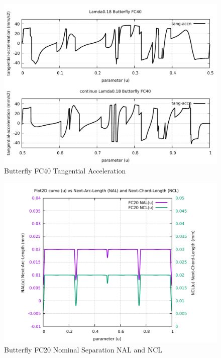\begin{figure}
	\caption     {Butterfly FC40 Tangential Acceleration}
	\label{24-img-Butterfly-FC40-Tangential-Acceleration.pdf}
	\includegraphics[width=1.00\textwidth]{Chap4/appendix/app-Butterfly/plots/24-img-Butterfly-FC40-Tangential-Acceleration.pdf}
\end{figure}

\clearpage
\pagebreak

\begin{figure}
	\caption     {Butterfly FC20 Nominal Separation NAL and NCL}
	\label{25-img-Butterfly-FC20-Nominal-Separation-NAL-and-NCL.pdf}
	\includegraphics[width=1.00\textwidth]{Chap4/appendix/app-Butterfly/plots/25-img-Butterfly-FC20-Nominal-Separation-NAL-and-NCL.pdf}
\end{figure}



